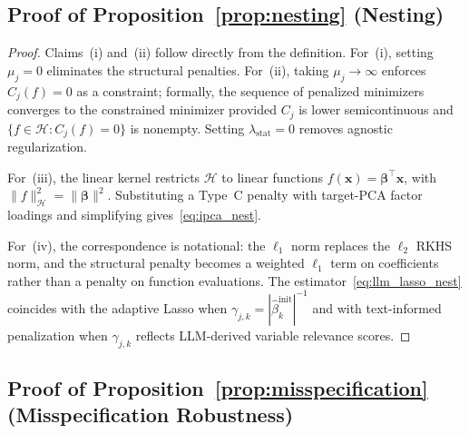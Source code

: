 \subsection{Proof of Proposition~\ref{prop:nesting} (Nesting)}

\begin{proof}
Claims~(i) and~(ii) follow directly from the definition.
For~(i), setting $\mu_j = 0$ eliminates the structural penalties.
For~(ii), taking $\mu_j \to \infty$ enforces $C_j(f) = 0$ as a constraint;
formally, the sequence of penalized minimizers converges to the
constrained minimizer provided $C_j$ is lower semicontinuous and
$\{f \in \mathcal{H} : C_j(f) = 0\}$ is nonempty.
Setting $\lambda_{\mathrm{stat}} = 0$ removes agnostic regularization.

For~(iii), the linear kernel restricts $\mathcal{H}$ to linear functions
$f(\mathbf{x}) = \boldsymbol{\beta}^\top \mathbf{x}$, with
$\|f\|_{\mathcal{H}}^2 = \|\boldsymbol{\beta}\|^2$.
Substituting a Type~C penalty with target-PCA factor loadings and
simplifying gives~\eqref{eq:ipca_nest}.

For~(iv), the correspondence is notational:
the $\ell_1$ norm replaces the $\ell_2$ RKHS norm,
and the structural penalty becomes a weighted $\ell_1$ term on coefficients
rather than a penalty on function evaluations.
The estimator~\eqref{eq:llm_lasso_nest} coincides with the adaptive
Lasso when $\gamma_{j,k} = |\hat{\beta}_k^{\mathrm{init}}|^{-1}$
and with text-informed penalization when $\gamma_{j,k}$ reflects
LLM-derived variable relevance scores.
\end{proof}

\subsection{Proof of Proposition~\ref{prop:misspecification} (Misspecification Robustness)}

